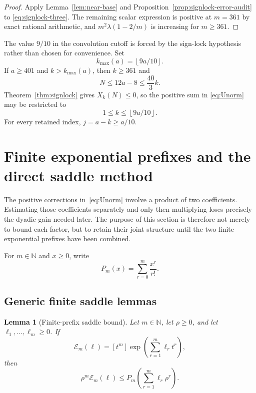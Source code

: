 \documentclass[11pt]{article}
\newtheorem{lemma}[theorem]{Lemma}
\theoremstyle{definition}
\theoremstyle{remark}
\newcommand{\floor}[1]{\left\lfloor #1\right\rfloor}
\begin{document}
\begin{proof}
Apply Lemma~\ref{lem:near-base} and
Proposition~\ref{prop:signlock-error-audit} to
\eqref{eq:signlock-three}.  The remaining scalar expression is positive at
$m=361$ by exact rational arithmetic, and
$m^2\lambda(1-2/m)$ is increasing for $m\ge361$.
\end{proof}

The value $9/10$ in the convolution cutoff is forced by the sign-lock
hypothesis rather than chosen for convenience.  Set
\[
  k_{\max}(a)=\floor{9a/10}.
\]
If $a\ge401$ and $k>k_{\max}(a)$, then $k\ge361$ and
\[
  N\le12a-8\le\frac{40}{3}k.
\]
Theorem~\ref{thm:signlock} gives $X_k(N)\le0$, so the positive sum in
\eqref{eq:Unorm} may be restricted to
\begin{equation}\label{eq:retained}
  1\le k\le\floor{9a/10}.
\end{equation}
For every retained index, $j=a-k\ge a/10$.

\section{Finite exponential prefixes and the direct saddle method}
\label{sec:saddle}

The positive corrections in~\eqref{eq:Unorm} involve a product of two
coefficients.  Estimating those coefficients separately and only then
multiplying loses precisely the dyadic gain needed later.  The purpose of this
section is therefore not merely to bound each factor, but to retain their
joint structure until the two finite exponential prefixes have been combined.

For $m\in\mathbb N$ and $x\ge0$, write
\begin{equation}\label{eq:exp-prefix}
  P_m(x)=\sum_{r=0}^m\frac{x^r}{r!}.
\end{equation}

\subsection{Generic finite saddle lemmas}

\begin{lemma}[Finite-prefix saddle bound]\label{lem:finite-saddle}
Let $m\in\mathbb N$, let $\rho\ge0$, and let
$\ell_1,\ldots,\ell_m\ge0$.  If
\[
 \mathcal E_m(\ell)=[t^m]\exp\left(\sum_{r=1}^{m}\ell_rt^r\right),
\]
then
\begin{equation}\label{eq:finite-saddle}
  \rho^m\mathcal E_m(\ell)
  \le P_m\left(\sum_{r=1}^m\ell_r\rho^r\right).
\end{equation}
\end{lemma}
\end{document}
